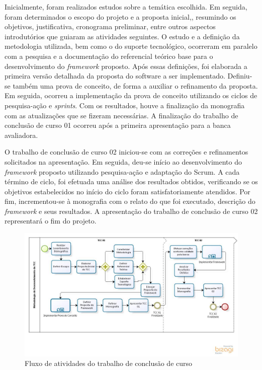  \par
 \indent Inicialmente, foram realizados estudos sobre a temática escolhida. Em seguida, foram determinados o escopo do projeto e a proposta inicial,, resumindo os objetivos, justificativa, cronograma preliminar, entre outros aspectos introdutórios que guiaram as atividades seguintes. O estudo e a definição  da metodologia utilizada, bem como o do suporte tecnológico, ocorreram em paralelo com a pesquisa e a documentação do referencial teórico base para o desenvolvimento do \textit{framework} proposto. Após essas definições, foi elaborada a primeira versão detalhada da proposta do software a ser implementado. Definiu-se também uma prova de conceito, de forma a auxiliar o refinamento da proposta. Em seguida, ocorreu a implementação da prova de conceito utilizando os ciclos de pesquisa-ação e \textit{sprints}. Com os resultados, houve a finalização da monografia com as atualizações que se fizeram necessárias. A finalização do trabalho de conclusão de curso 01 ocorreu após a primeira apresentação para a banca avaliadora.
 \par
 \indent O trabalho de conclusão de curso 02 iniciou-se com as correções e refinamentos solicitados na apresentação. Em seguida,  deu-se início ao desenvolvimento do \textit{framework} proposto utilizando pesquisa-ação e adaptação do Scrum. A cada término de ciclo, foi efetuada uma análise dos resultados obtidos, verificando se os objetivos estabelecidos no início do ciclo foram satisfatoriamente atendidos. Por fim, incrementou-se à monografia com o relato do que foi executado, descrição do \textit{framework} e seus resultados.  A apresentação do trabalho de conclusão de curso 02 representará o fim do projeto.
 	
  \begin{figure}[h]
    \centering
    \includegraphics[width=\textwidth]{figuras/processo.jpg}
    \caption{Fluxo de atividades do trabalho de conclusão de curso}
    \label{fig:processo}
  \end{figure}

